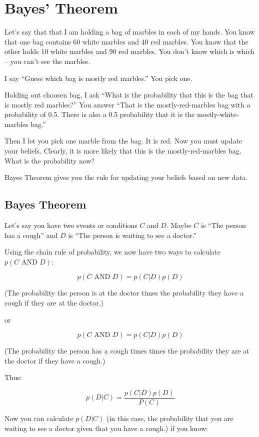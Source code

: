 \chapter{Bayes' Theorem}

Let's say that that I am holding a bag of marbles in each of my hands.
You know that one bag contains 60 white marbles and 40 red marbles. You
know that the other holds 10 white marbles and 90 red marbles. You
don't know which is which -- you can't see the marbles.

I say ``Guess which bag is mostly red marbles.'' You pick one.

Holding out choosen bag, I ask ``What is the probability
that this is the bag that is mostly red marbles?'' You answer ``That
is the mostly-red-marbles bag with a probability of 0.5.  There is
also a 0.5 probability that it is the mostly-white-marbles bag.''

Then I let you pick one marble from the bag.  It is red. Now you must
update your beliefs. Clearly, it is more likely that this is the
mostly-red-marbles bag. What is the probability now?

Bayes Theorem gives you the rule for updating your beliefs based on
new data.

\section{Bayes Theorem}

Let's say you have two events or conditions $C$ and $D$.  Maybe $C$ is
``The person has a cough'' and $D$ is ``The person is waiting to see a doctor.''

Using the chain rule of probability, we now have two ways to calculate $p(C \text{ AND } D)$:

$$p(C \text{ AND } D) = p(C | D) p(D)$$

(The probability the person is at the doctor times the probability they have a cough if they are at the doctor.)

or 

$$p(C \text{ AND } D) = p(C | D) p(D)$$

(The probability the person has a cough times times the probability they are at the doctor if they have a cough.)

Thus:

$$p(D | C) = \frac {p(C | D)p(D)}{P(C)}$$

Now you can calculate $p(D | C)$ (in this case, the probability that
you are waiting to see a doctor given that you have a cough.) if you
know:

